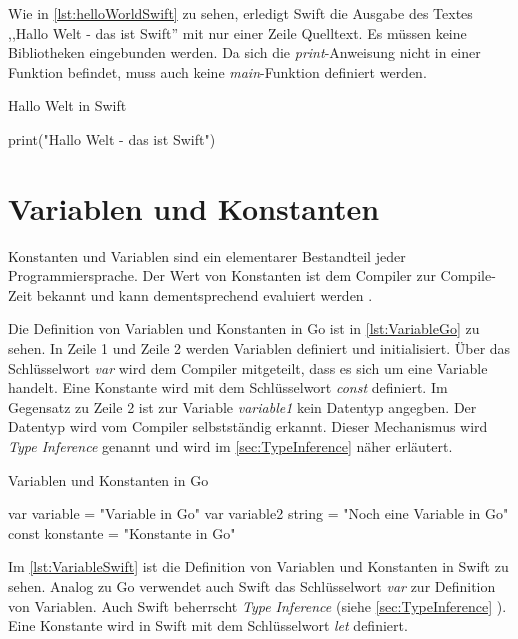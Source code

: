 Wie in \autoref{lst:helloWorldSwift} zu sehen, erledigt Swift die Ausgabe des Textes ,,Hallo Welt - das ist Swift'' mit nur einer Zeile Quelltext. Es müssen keine Bibliotheken eingebunden werden. Da sich die \emph{print}-Anweisung nicht in einer Funktion befindet, muss auch keine \emph{main}-Funktion definiert werden\cite{Apple.2017}.

\begin{listing}[H]
\caption{Hallo Welt in Swift}
\label{lst:helloWorldSwift}
\begin{SwiftCode}
print("Hallo Welt - das ist Swift")
\end{SwiftCode}
\end{listing}

\section{Variablen und Konstanten}
Konstanten und Variablen sind ein elementarer Bestandteil jeder Programmiersprache. 
Der Wert von Konstanten ist dem Compiler zur Compile-Zeit bekannt und kann dementsprechend evaluiert werden \cite{Donovan.2016}. 

Die Definition von Variablen und Konstanten in Go ist in \autoref{lst:VariableGo} zu sehen.
In Zeile 1 und Zeile 2 werden Variablen definiert und initialisiert.
Über das Schlüsselwort \emph{var} wird dem Compiler mitgeteilt, dass es sich um eine Variable handelt.
Eine Konstante wird mit dem Schlüsselwort \emph{const} definiert.
Im Gegensatz zu Zeile 2 ist zur Variable \emph{variable1} kein Datentyp angegben. 
Der Datentyp wird vom Compiler selbstständig erkannt. 
Dieser Mechanismus wird \emph{Type Inference} genannt und wird im \autoref{sec:TypeInference}  näher erläutert.

\begin{listing}
\caption{Variablen und Konstanten in Go}
\label{lst:VariableGo}
\begin{GoCode}
var variable = "Variable in Go"
var variable2 string = "Noch eine Variable in Go"
const konstante = "Konstante in Go"
\end{GoCode}
\end{listing}

Im \autoref{lst:VariableSwift} ist die Definition von Variablen und Konstanten in Swift zu sehen. 
Analog zu Go verwendet auch Swift das Schlüsselwort \emph{var} zur Definition von Variablen.
Auch Swift beherrscht \emph{Type Inference} (siehe \autoref{sec:TypeInference} ).
Eine Konstante wird in Swift mit dem Schlüsselwort \emph{let} definiert.

